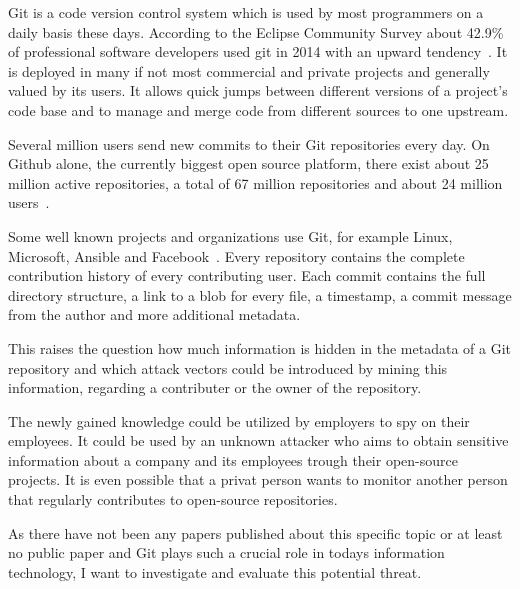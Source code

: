 Git is a code version control system which is used by most programmers on a daily basis these days.
According to the Eclipse Community Survey about 42.9\% of professional software developers used git in 2014 with an upward tendency~\cite{article:git-popularity}.
It is deployed in many if not most commercial and private projects and generally valued by its users.
It allows quick jumps between different versions of a project's code base and to manage and merge code from different sources to one upstream.

Several million users send new commits to their Git repositories every day.
On Github alone, the currently biggest open source platform, there exist about 25 million active repositories, a total of 67 million repositories and about 24 million users~\cite{article:github-statistics}.

Some well known projects and organizations use Git, for example Linux, Microsoft, Ansible and Facebook~\cite{article:github-statistics}.
Every repository contains the complete contribution history of every contributing user.
Each commit contains the full directory structure, a link to a blob for every file, a timestamp, a commit message from the author and more additional metadata.

This raises the question how much information is hidden in the metadata of a Git repository and which attack vectors could be introduced by mining this information, regarding a contributer or the owner of the repository.

The newly gained knowledge could be utilized by employers to spy on their employees.
It could be used by an unknown attacker who aims to obtain sensitive information about a company and its employees trough their open-source projects.
It is even possible that a privat person wants to monitor another person that regularly contributes to open-source repositories.

As there have not been any papers published about this specific topic or at least no public paper and Git plays such a crucial role in todays information technology, I want to investigate and evaluate this potential threat.
